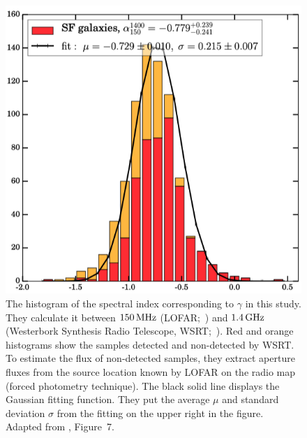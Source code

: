 \begin{figure}[htbp]
	\centering
	\includegraphics[width=.7\linewidth]{Chapter_6/Figures/CalistroRivera2017_Figure7.png}
    \caption[The histogram of the spectral index in \citet{CalistroRivera2017a}]{\label{fig:CalistroRivera2017_figure7}
        The histogram of the spectral index corresponding to $\gamma$ in this study.
        They calculate it between $150\,\mathrm{MHz}$ (LOFAR;~\citealt{Williams2016}) and $1.4\,\mathrm{GHz}$ (Westerbork Synthesis Radio Telescope, WSRT;~\citealt{DeVries2002}).
        Red and orange histograms show the samples detected and non-detected by WSRT\@.
        To estimate the flux of non-detected samples, they extract aperture fluxes from the source location known by LOFAR on the radio map (forced photometry technique).
        The black solid line displays the Gaussian fitting function.
        They put the average $\mu$ and standard deviation $\sigma$ from the fitting on the upper right in the figure.
        Adapted from \citealt{CalistroRivera2017a}, Figure~7.
    }
\end{figure}

